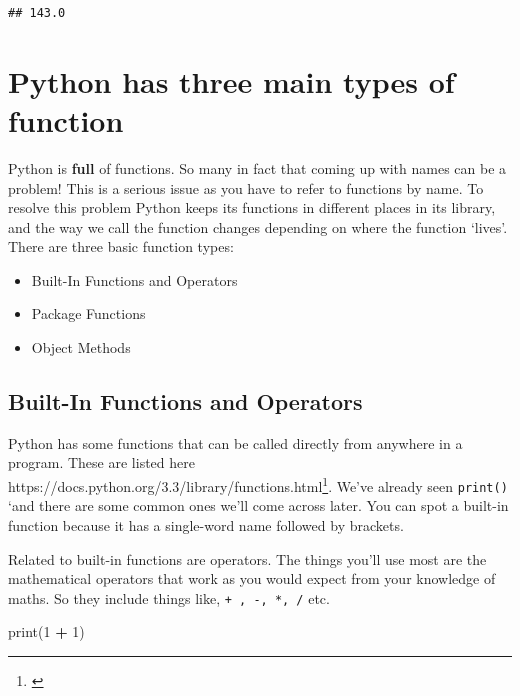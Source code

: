 \documentclass[]{book}
\newenvironment{Shaded}{\begin{snugshade}}{\end{snugshade}}
\newcommand{\BuiltInTok}[1]{#1}
\newcommand{\DecValTok}[1]{\textcolor[rgb]{0.00,0.00,0.81}{#1}}
\newcommand{\NormalTok}[1]{#1}
\newcommand{\OperatorTok}[1]{\textcolor[rgb]{0.81,0.36,0.00}{\textbf{#1}}}
\providecommand{\tightlist}{%
  \setlength{\itemsep}{0pt}\setlength{\parskip}{0pt}}
\let\rmarkdownfootnote\footnote%
\def\footnote{\protect\rmarkdownfootnote}
\renewcommand{\href}[2]{#2\footnote{\url{#1}}}
\theoremstyle{definition}
\theoremstyle{definition}
\theoremstyle{definition}
\theoremstyle{remark}
\begin{document}
\begin{verbatim}
## 143.0
\end{verbatim}

\hypertarget{python-has-three-main-types-of-function}{%
\section{Python has three main types of
function}\label{python-has-three-main-types-of-function}}

Python is \textbf{full} of functions. So many in fact that coming up
with names can be a problem! This is a serious issue as you have to
refer to functions by name. To resolve this problem Python keeps its
functions in different places in its library, and the way we call the
function changes depending on where the function `lives'. There are
three basic function types:

\begin{itemize}
\tightlist
\item
  Built-In Functions and Operators
\item
  Package Functions
\item
  Object Methods
\end{itemize}

\hypertarget{built-in-functions-and-operators}{%
\subsection{Built-In Functions and
Operators}\label{built-in-functions-and-operators}}

Python has some functions that can be called directly from anywhere in a
program. These are listed here
\href{}{https://docs.python.org/3.3/library/functions.html}. We've
already seen \texttt{print()} `and there are some common ones we'll come
across later. You can spot a built-in function because it has a
single-word name followed by brackets.

Related to built-in functions are operators. The things you'll use most
are the mathematical operators that work as you would expect from your
knowledge of maths. So they include things like,
\texttt{+\ ,\ -,\ *,\ /} etc.

\begin{Shaded}
\begin{Highlighting}[]
\BuiltInTok{print}\NormalTok{(}\DecValTok{1} \OperatorTok{+} \DecValTok{1}\NormalTok{)}
\end{Highlighting}
\end{Shaded}
\end{document}
